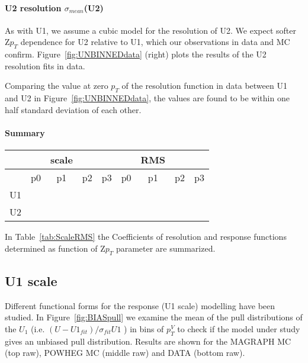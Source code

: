 \documentclass[41pt,a4paper,oneside]{report}
\begin{document}
\paragraph{U2 resolution $\sigma_{mean}$(U2)}
As with U1, we assume a cubic model for the resolution of U2. We expect softer Z$p_{T}$ dependence for U2 relative to U1,
which our observations in data and MC confirm.
Figure~\ref{fig:UNBINNEDdata} (right) plots the results of the U2 resolution fits in data. 


Comparing the value at zero $p_{T}$  of the resolution function in data between U1 and U2 in Figure~\ref{fig:UNBINNEDdata}, the values are found to be within one half standard deviation of each other.

\paragraph{Summary}

\begin{table*}[tH]
\begin{center}
\caption{Summary of the parameters for the scale ad RMS on the unbinned fit.{\color{magenta}{add data and split the data as runA and runB}}
Those are obtained in the MC.}
\begin{tabular}{l | c c c c | c c c c}
\hline
 &  & scale  &  &  &  & RMS &  & \\
\hline
         & p0 & p1 & p2 & p3 & p0 & p1 & p2 & p3\\
\hline
U1 &  &  &  & &  &  &  & \\
\hline
U2 &  &  &  &  &  &  &  &\\
\hline
\hline
\end{tabular}
    \label{tab:ScaleRMS}
\end{center}
\end{table*}

In Table~\ref{tab:ScaleRMS} the Coefficients of resolution and response functions determined as function of Z$p_{T}$
parameter are summarized.

\subsection{U1 scale}
\label{sec:U1scale}

Different functional forms for the response (U1 scale) modelling have been studied.
In Figure~\ref{fig:BIASpull} we examine the mean of the pull distributions of the $U_{1}$ (i.e. $( U-U1_{fit} )/\sigma_{fit}U1$ ) in bins of $p^{V}_{T}$
to check if the model under study gives an unbiased pull distribution.
Results are shown for the MAGRAPH MC (top raw), POWHEG MC (middle raw) and DATA (bottom raw).
\end{document}
